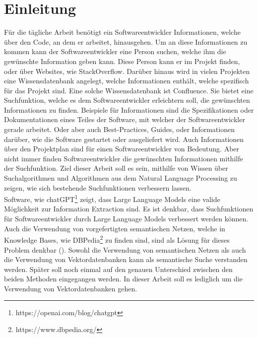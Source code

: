 \chapter{Einleitung}
Für die tägliche Arbeit benötigt ein Softwareentwickler Informationen, welche über den Code, an dem er arbeitet, hinausgehen.
Um an diese Informationen zu kommen kann der Softwareentwickler eine Person suchen, welche ihm die gewünschte Information geben kann.
Diese Person kann er im Projekt finden, oder über Websites, wie StackOverflow.
Darüber hinaus wird in vielen Projekten eine Wissensdatenbank angelegt, welche Informationen enthält, welche spezifisch für das Projekt sind.
Eine solche Wissensdatenbank ist Confluence.
Sie bietet eine Suchfunktion, welche es dem Softwareentwickler erleichtern soll, die gewünschten Informationen zu finden.
Beispiele für Informationen sind die Spezifikationen oder Dokumentationen eines Teiles der Software, mit welcher der Softwareentwickler gerade arbeitet.
Oder aber auch Best-Practices, Guides, oder Informationen darüber, wie die Software gestartet oder ausgeliefert wird.
Auch Informationen über den Projektplan sind für einen Softwareentwickler von Bedeutung.
Aber nicht immer finden Softwareentwickler die gewünschten Informationen mithilfe der Suchfunktion.
Ziel dieser Arbeit soll es sein, mithilfe von Wissen über Suchalgorithmen und Algorithmen aus dem Natural Language Processing zu zeigen, wie sich bestehende Suchfunktionen verbessern lassen.\\

Software, wie chatGPT\footnote{https://openai.com/blog/chatgpt} zeigt, dass Large Language Models eine valide Möglichkeit zur Information Extraction sind.
Es ist denkbar, dass Suchfunktionen für Softwareentwickler durch Large Language Models verbessert werden können.
Auch die Verwendung von vorgefertigten semantischen Netzen, welche in Knowledge Bases, wie DBPedia\footnote{https://www.dbpedia.org/} zu finden sind, sind als Lösung für dieses Problem denkbar (\cite{1644735}).
Sowohl die Verwendung von semantischen Netzen als auch die Verwendung von Vektordatenbanken kann als semantische Suche verstanden werden.
Später soll noch einmal auf den genauen Unterschied zwischen den beiden Methoden eingegangen werden.
In dieser Arbeit soll es lediglich um die Verwendung von Vektordatenbanken gehen.

